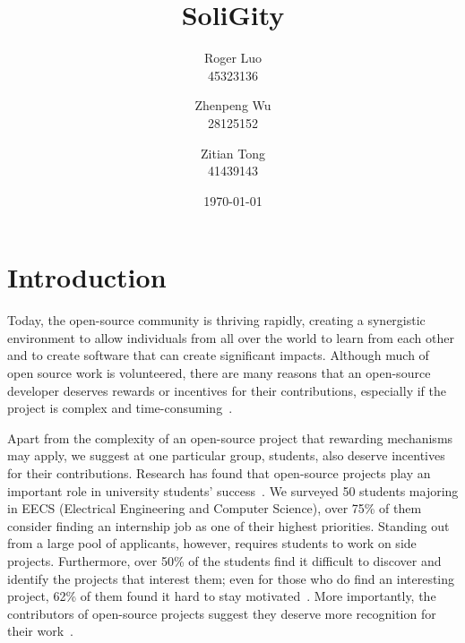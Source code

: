 \documentclass[12pt]{article}
\title{SoliGity}
\author{  
  Roger Luo\\
  45323136
  \and
  Zhenpeng Wu\\
  28125152 
  \and
  Zitian Tong\\
  41439143
}
\date{\today}
\renewcommand{\_}{\kern-1.5pt\textunderscore\kern-1.5pt}
\begin{document}
\maketitle

\section{Introduction}

Today, the open-source community is thriving rapidly, creating a synergistic environment to allow individuals
from all over the world to learn from each other and to create software that can create significant impacts.
Although much of open source work is volunteered, there are many reasons that an open-source developer deserves
rewards or incentives for their contributions, especially if the project is complex and time-consuming~\cite{community_collaboration}.

Apart from the complexity of an open-source project that rewarding mechanisms may apply, we suggest at one
particular group, students, also deserve incentives for their contributions. Research has found that open-source
projects play an important role in university students’ success~\cite{open_source_guides}. We surveyed 50
students majoring in EECS (Electrical Engineering and Computer Science), over 75\% of them consider finding
an internship job as one of their highest priorities. Standing out from a large pool of applicants, however,
requires students to work on side projects. Furthermore, over 50\% of the students find it difficult to discover
and identify the projects that interest them; even for those who do find an interesting project, 62\% of them
found it hard to stay motivated~\cite{thomas_toch_2014}. More importantly, the contributors of open-source
projects suggest they deserve more recognition for their work~\cite{freecodecamp.org_2018}.
\end{document}
